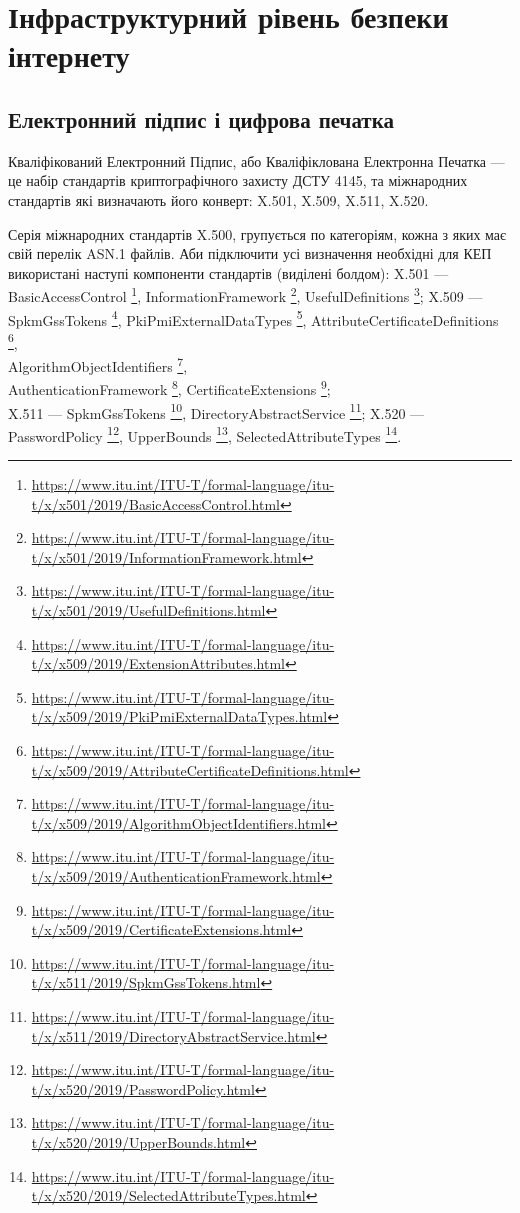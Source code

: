 \chapter{Інфраструктурний рівень безпеки інтернету}

\section{Електронний підпис і цифрова печатка}

Кваліфікований Електронний Підпис, або Кваліфіклована Електронна Печатка ---
це набір стандартів криптографічного захисту ДСТУ 4145,
та міжнародних стандартів які визначають його конверт: X.501, X.509, X.511, X.520.

\renewcommand{\footnotesize}{\scriptsize}

Серія міжнародних стандартів X.500, групується по категоріям, кожна
з яких має свій перелік ASN.1 файлів. Аби підключити усі визначення необхідні
для КЕП використані наступі компоненти стандартів (виділені болдом):
X.501 --- BasicAccessControl \footnote{\url{https://www.itu.int/ITU-T/formal-language/itu-t/x/x501/2019/BasicAccessControl.html}},
InformationFramework \footnote{\url{https://www.itu.int/ITU-T/formal-language/itu-t/x/x501/2019/InformationFramework.html}},
UsefulDefinitions \footnote{\url{https://www.itu.int/ITU-T/formal-language/itu-t/x/x501/2019/UsefulDefinitions.html}};
X.509 --- SpkmGssTokens \footnote{\url{https://www.itu.int/ITU-T/formal-language/itu-t/x/x509/2019/ExtensionAttributes.html}},
PkiPmiExternalDataTypes \footnote{\url{https://www.itu.int/ITU-T/formal-language/itu-t/x/x509/2019/PkiPmiExternalDataTypes.html}},
AttributeCertificateDefinitions \footnote{\url{https://www.itu.int/ITU-T/formal-language/itu-t/x/x509/2019/AttributeCertificateDefinitions.html}}, \\
AlgorithmObjectIdentifiers \footnote{\url{https://www.itu.int/ITU-T/formal-language/itu-t/x/x509/2019/AlgorithmObjectIdentifiers.html}}, \\
AuthenticationFramework \footnote{\url{https://www.itu.int/ITU-T/formal-language/itu-t/x/x509/2019/AuthenticationFramework.html}},
CertificateExtensions \footnote{\url{https://www.itu.int/ITU-T/formal-language/itu-t/x/x509/2019/CertificateExtensions.html}}; \\
X.511 --- SpkmGssTokens \footnote{\url{https://www.itu.int/ITU-T/formal-language/itu-t/x/x511/2019/SpkmGssTokens.html}},
DirectoryAbstractService \footnote{\url{https://www.itu.int/ITU-T/formal-language/itu-t/x/x511/2019/DirectoryAbstractService.html}};
X.520 --- PasswordPolicy \footnote{\url{https://www.itu.int/ITU-T/formal-language/itu-t/x/x520/2019/PasswordPolicy.html}},
UpperBounds \footnote{\url{https://www.itu.int/ITU-T/formal-language/itu-t/x/x520/2019/UpperBounds.html}},
SelectedAttributeTypes \footnote{\url{https://www.itu.int/ITU-T/formal-language/itu-t/x/x520/2019/SelectedAttributeTypes.html}}.

